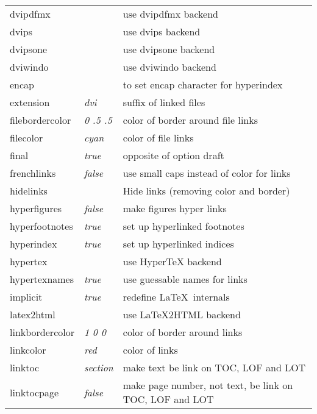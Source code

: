 \documentclass{article}
\begin{document}
\begin{longtable}{@{}>{\ttfamily}llp{7cm}@{}}
dvipdfmx           &                        & use \textsf{dvipdfmx} backend \\
dvips              &                        & use \textsf{dvips} backend \\
dvipsone           &                        & use \textsf{dvipsone} backend \\
dviwindo           &                        & use \textsf{dviwindo} backend \\
encap              &                        & to set encap character for hyperindex \\
extension          & \textit{dvi}           & suffix of linked files \\
filebordercolor    & \textit{0 .5 .5}       & color of border around file links \\
filecolor          & \textit{cyan}          & color of file links \\
final              & \textit{true}          & opposite of option draft \\
frenchlinks        & \textit{false}         & use small caps instead of color for links \\
hidelinks          &                        & Hide links (removing color and border) \\
hyperfigures       & \textit{false}         & make figures hyper links \\
hyperfootnotes     & \textit{true}          & set up hyperlinked footnotes \\
hyperindex         & \textit{true}          & set up hyperlinked indices \\
hypertex           &                        & use \textsf{Hyper\TeX} backend \\
hypertexnames      & \textit{true}          & use guessable names for links \\
implicit           & \textit{true}          & redefine \LaTeX\ internals \\
latex2html         &                        & use \textsf{\LaTeX2HTML} backend \\
linkbordercolor    & \textit{1 0 0}         & color of border around links \\
linkcolor          & \textit{red}           & color of links \\
linktoc            & \textit{section}       & make text be link on TOC, LOF and LOT \\
linktocpage        & \textit{false}         & make page number, not text, be link on TOC, LOF and LOT \\

\end{longtable}
\end{document}
